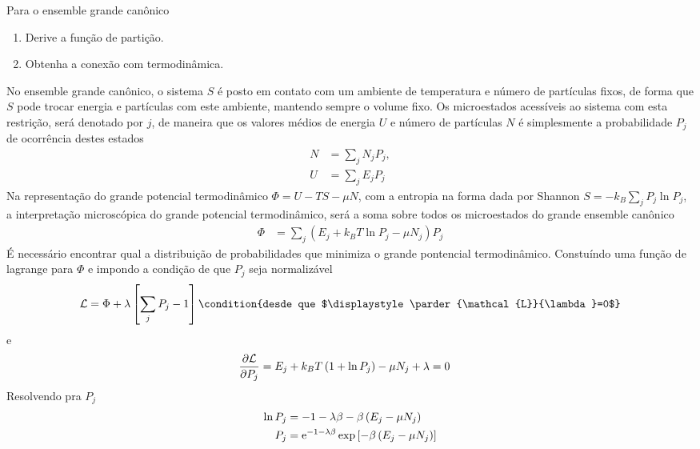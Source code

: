 \begin{prob}
  Para o ensemble grande canônico
  \begin{enumerate}[label=\alph *)]
    \item Derive a função de partição.
    \item Obtenha a conexão com termodinâmica.
  \end{enumerate}
  \begin{sol}
    No ensemble grande canônico, o sistema $S$ é posto em contato com um ambiente de temperatura e número de partículas fixos, de forma que $S$ pode trocar energia e partículas com este ambiente, mantendo sempre o volume fixo. Os microestados acessíveis ao sistema com esta restrição, será denotado por $j$, de maneira que os valores médios de energia $U$ e número de partículas $N$ é simplesmente a probabilidade $P_{j}$ de ocorrência destes estados
    \begin{align}
      N&=\sum_{j}N_jP_{j},\\
      U&=\sum_{j}E_{j}P_{j}
    \end{align}
    Na representação do grande potencial termodinâmico $\Phi =U-TS-\mu N$, com a entropia na forma dada por Shannon $S=-k_B\sum_jP_j\ln P_{j}$, a interpretação microscópica do grande potencial termodinâmico, será a soma sobre todos os microestados do grande ensemble canônico
    \begin{align}
      \Phi&=\sum_j\left(E_j+k_BT\ln P_j-\mu N_j\right)P_j
    \end{align}
    É necessário encontrar qual a distribuição de probabilidades que minimiza o grande pontencial termodinâmico. Constuíndo uma função de lagrange para $\Phi$ e impondo a condição de que $P_j$ seja normalizável
    \begin{dmath*}
      \mathcal{L}=\Phi+\lambda\left[\sum_jP_j-1\right]\condition{desde que $\displaystyle\parder{\mathcal{L}}{\lambda}=0$}
    \end{dmath*}
    e
    \begin{align}
      \frac{\partial {\mathcal{L}}}{\partial {P_j}}&=E_j+k_BT\left(1+\ln P_j\right)-\mu N_j+\lambda=0
    \end{align}
    Resolvendo pra $P_j$
    \begin{align}
      \begin{split}
        \ln P_j&=-1-\lambda\beta-\beta\left(E_j-\mu N_j\right)\\
        P_j&=\E^{-1-\lambda\beta}\exp\left[-\beta\left(E_j-\mu N_j\right)\right]

\end{split}
\end{align}
\end{sol}
\end{prob}
